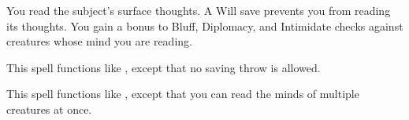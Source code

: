 \spellrng{\rngmed}
\begin{spelleffect}
  You read the subject's surface thoughts. A Will save prevents you from reading its thoughts. You gain a  bonus to Bluff, Diplomacy, and Intimidate checks against creatures whose mind you are reading.
\end{spelleffect}

\begin{spelleffect}
    This spell functions like , except that no saving throw is allowed.
\end{spelleffect}

\begin{spelleffect}
    This spell functions like , except that you can read the minds of multiple creatures at once. 
\end{spelleffect}

